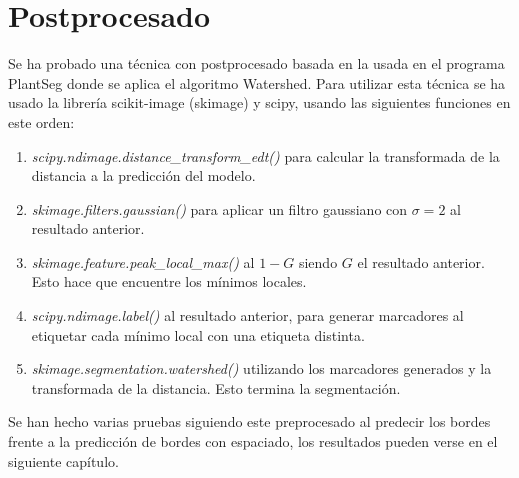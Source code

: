 \section{Postprocesado}\label{sec:data_loading_processing}

Se ha probado una técnica con postprocesado basada en la usada en el programa PlantSeg \cite{Wolny2020} donde se aplica el algoritmo Watershed. Para utilizar esta técnica se ha usado la librería scikit-image (skimage) y scipy, usando las siguientes funciones en este orden:
\begin{enumerate}
\item \textit{scipy.ndimage.distance\_transform\_edt()} para calcular la transformada de la distancia a la predicción del modelo.
\item \textit{skimage.filters.gaussian()} para aplicar un filtro gaussiano con $\sigma = 2$ al resultado anterior.
\item \textit{skimage.feature.peak\_local\_max()} al $1 - G$ siendo $G$ el resultado anterior. Esto hace que encuentre los mínimos locales.
\item \textit{scipy.ndimage.label()} al resultado anterior, para generar marcadores al etiquetar cada mínimo local con una etiqueta distinta.
\item \textit{skimage.segmentation.watershed()} utilizando los marcadores generados y la transformada de la distancia. Esto termina la segmentación.
\end{enumerate}

Se han hecho varias pruebas siguiendo este preprocesado al predecir los bordes frente a la predicción de bordes con espaciado, los resultados pueden verse en el siguiente capítulo.